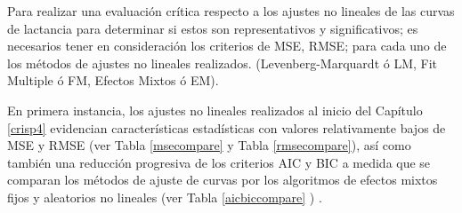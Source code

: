 Para realizar una evaluación crítica respecto a los ajustes no lineales de las curvas de lactancia para determinar si estos son representativos y significativos; es necesarios tener en consideración los criterios de MSE, RMSE; para cada uno de los métodos de ajustes no lineales realizados. (Levenberg-Marquardt ó LM, Fit Multiple ó FM, Efectos Mixtos ó EM).


\begin{table}[h]
\centering
\caption{Comparación de la raíz del error cuadrático medio (RMSE) para cada método de ajuste no lineal.}
\label{rmsecompare}
\end{table}

En primera instancia, los ajustes no lineales realizados al inicio del Capítulo \ref{crisp4} evidencian características estadísticas con valores relativamente bajos de MSE y RMSE (ver Tabla \ref{msecompare} y Tabla \ref{rmsecompare}), así como también una reducción progresiva de los criterios AIC y BIC a medida que se comparan los métodos de ajuste de curvas por los algoritmos de efectos mixtos fijos y aleatorios no lineales (ver Tabla \ref{aicbiccompare} ) .

